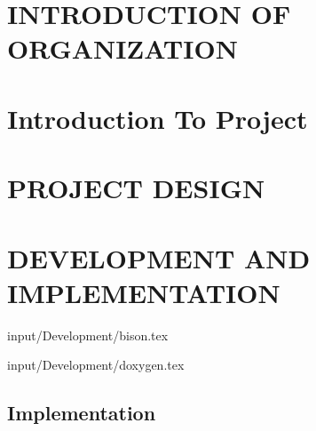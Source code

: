 \documentclass[12pt]{report}
\begin{document}

\begin{screen}
\ppttitle
\end{screen}

\thispagestyle{empty} 
\pagetitle
\newpage
{}
\cfoot{\thepage}


\newpage


\newpage
\tableofcontents
\newpage
\listoffigures
\newpage
\listoftables
\newpage


\cfoot{\thepage}

\newpage
\chapter{INTRODUCTION OF ORGANIZATION}

\newpage


\chapter{Introduction To Project}








\chapter{PROJECT DESIGN}








\newpage
\chapter{DEVELOPMENT AND IMPLEMENTATION}


 {input/Development/bison.tex}

%
%
%

 {input/Development/doxygen.tex}


\section{Implementation}
\end{document}
